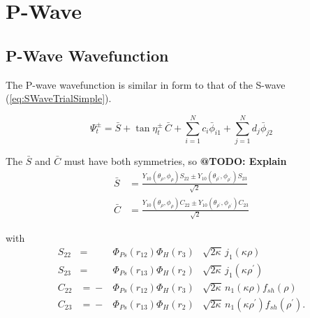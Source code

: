 \documentclass[Dissertation.tex]{subfiles}
\begin{document}
\chapter{P-Wave}
\label{chp:PWave}

\section{P-Wave Wavefunction}
\label{sec:PWaveFn}
The P-wave wavefunction is similar in form to that of the S-wave (\ref{eq:SWaveTrialSimple}).

\begin{equation}
\Psi_t^\pm = \bar{S} + \tan \eta_t^\pm \, \bar{C} + \sum_{i=1}^N c_i \bar{\phi}_{i1} + \sum_{j=1}^N d_j \bar{\phi}_{j2}
\label{eq:PWaveSimple}
\end{equation}

\noindent The $\bar{S}$ and $\bar{C}$ must have both symmetries, so \textbf{@TODO: Explain}
\begin{subequations}
\label{eq:PWaveSandCBar}
\begin{align}
\bar{S} &= \frac{Y_{10}(\theta_\rho,\phi_\rho)S_{22} \pm Y_{10}(\theta_{\rho^\prime},\phi_{\rho^\prime})S_{23} }{\sqrt{2}} \label{eq:PWaveSBar} \\
\bar{C} &= \frac{Y_{10}(\theta_\rho,\phi_\rho)C_{22} \pm Y_{10}(\theta_{\rho^\prime},\phi_{\rho^\prime})C_{23} }{\sqrt{2}} \label{eq:PWaveCBar} 
\end{align}
\end{subequations}

\noindent with
\begin{subequations}
\label{eq:PWaveSandC}
\begin{alignat}{2}
S_{22} &={}&\Phi_{Ps}\left(r_{12}\right) \Phi_H\left(r_3\right) &\sqrt{2\kappa} \,j_1\!\left(\kappa\rho\right) \label{eq:PWaveS22Def} \\
S_{23} &={}&\Phi_{Ps}\left(r_{13}\right) \Phi_H\left(r_2\right) &\sqrt{2\kappa} \,j_1\!\left(\kappa\rho^\prime\right) \label{eq:PWaveS23Def} \\
C_{22} &={}-&\Phi_{Ps}\left(r_{12}\right) \Phi_H\left(r_3\right) &\sqrt{2\kappa} \,n_1\!\left(\kappa\rho\right) f_{sh}(\rho) \label{eq:PWaveC22Def} \\
C_{23} &={}-&\Phi_{Ps}\left(r_{13}\right) \Phi_H\left(r_2\right) &\sqrt{2\kappa} \,n_1\!\left(\kappa\rho^\prime\right) f_{sh}(\rho^\prime). \label{eq:PWaveC23Def}
\end{alignat}
\end{subequations}
\end{document}
